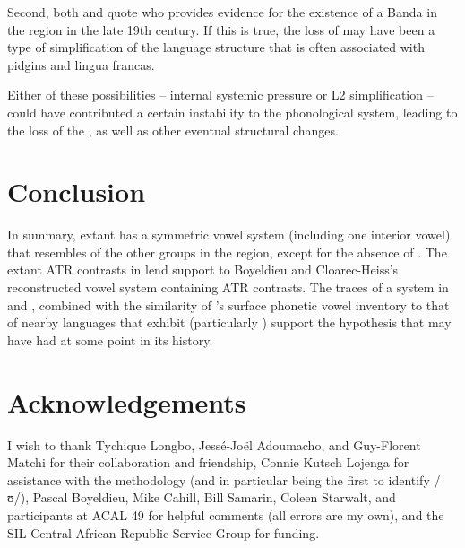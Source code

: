 \documentclass[output=paper,colorlinks,citecolor=brown]{langscibook}
\begin{document}
Second, both \citet{Samarin1982} and \citet{Cloarec-Heiss1995} quote \citet[205--206]{Brunache1894} who provides evidence for the existence of a Banda   in the region in the late 19th century. If this is true, the loss of  may have been a type of simplification of the language structure that is often associated with pidgins  and  lingua francas.

Either of these possibilities -- internal systemic pressure or L2 simplification -- could have contributed a certain instability to the phonological system, leading to the loss of the , as well as other eventual structural changes.

\section{Conclusion}\label{sec:olson:5}

In summary, extant  has a symmetric  vowel system  (including one interior vowel) that resembles  of the other groups in the region, except for the absence of . The extant ATR contrasts in  lend support to Boyeldieu and Cloarec-Heiss’s reconstructed  vowel system  containing ATR contrasts. The traces of a  system in  and , combined with the similarity of ’s surface phonetic vowel inventory to that of nearby languages that exhibit  (particularly ) support the hypothesis that  may have had  at some point in its history.

\section*{Acknowledgements}

I wish to thank Tychique Longbo, Jessé-Joël Adoumacho, and Guy-Florent Matchi for their collaboration and friendship, Connie Kutsch Lojenga for assistance with the methodology (and in particular being the first to identify /ʊ/), Pascal Boyeldieu, Mike Cahill, Bill Samarin, Coleen Starwalt, and participants at ACAL 49 for helpful comments (all errors are my own), and the SIL Central African Republic Service Group for funding.

\printbibliography[heading=subbibliography,notkeyword=this]
\end{document}
